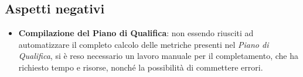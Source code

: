 \subsection{Aspetti negativi}
\begin{itemize}
    \item \textbf{Compilazione del Piano di Qualifica}: non essendo riusciti ad automatizzare il completo calcolo delle metriche presenti nel \textit{Piano di Qualifica}, si è reso necessario un lavoro manuale per il completamento, che ha richiesto tempo e risorse, nonché la possibilità di commettere errori.
\end{itemize}